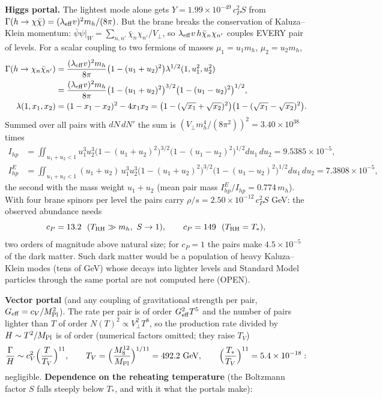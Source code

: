 \documentclass[10pt,a4paper]{article}
\begin{document}
\textbf{Higgs portal.} The lightest mode alone gets $Y=1.99\times10^{-49}\,c_P^2S$ from $\Gamma(h\to\chi\bar\chi)=(\lambda_{\rm eff}v)^2m_h/(8\pi)$. But the brane breaks the conservation of Kaluza–Klein momentum: $\bar\psi\psi|_W=\sum_{n,n'}\bar\chi_n\chi_{n'}/V_\perp$, so $\lambda_{\rm eff}v\,h\bar\chi_n\chi_{n'}$ couples EVERY pair of levels. For a scalar coupling to two fermions of masses $\mu_1=u_1m_h$, $\mu_2=u_2m_h$,
\begin{align*}
\Gamma(h\to\chi_n\bar\chi_{n^\prime})&=\frac{(\lambda_{\rm eff}v)^2m_h}{8\pi}\big(1-(u_1+u_2)^2\big)\lambda^{1/2}(1,u_1^2,u_2^2) \\
&=\frac{(\lambda_{\rm eff}v)^2m_h}{8\pi}\big(1-(u_1+u_2)^2\big)^{3/2}\big(1-(u_1-u_2)^2\big)^{1/2}, \\
\lambda(1,x_1,x_2)&=(1-x_1-x_2)^2-4x_1x_2=\big(1-(\sqrt{x_1}+\sqrt{x_2})^2\big)\big(1-(\sqrt{x_1}-\sqrt{x_2})^2\big).
\end{align*}
Summed over all pairs with $dN\,dN'$ the sum is $(V_\perp m_h^4/(8\pi^2))^2=3.40\times10^{38}$ times
\begin{align*}
I_{hp}&=\iint_{u_1+u_2<1}u_1^3u_2^3\big(1-(u_1+u_2)^2\big)^{3/2}\big(1-(u_1-u_2)^2\big)^{1/2}du_1\,du_2=9.5385\times10^{-5}, \\
I_{hp}^E&=\iint_{u_1+u_2<1}(u_1+u_2)\,u_1^3u_2^3\big(1-(u_1+u_2)^2\big)^{3/2}\big(1-(u_1-u_2)^2\big)^{1/2}du_1\,du_2=7.3808\times10^{-5},
\end{align*}
the second with the mass weight $u_1+u_2$ (mean pair mass $I^E_{hp}/I_{hp}=0.774\,m_h$). With four brane spinors per level the pairs carry $\rho/s=2.50\times10^{-12}\,c_P^2S$ GeV: the observed abundance needs
\begin{equation*}
c_P=13.2\ \ (T_{\rm RH}\gg m_h,\ S\to1),\qquad c_P=149\ \ (T_{\rm RH}=T_*),
\end{equation*}
two orders of magnitude above natural size; for $c_P=1$ the pairs make $4.5\times10^{-5}$ of the dark matter. Such dark matter would be a population of heavy Kaluza–Klein modes (tens of GeV) whose decays into lighter levels and Standard Model particles through the same portal are not computed here (OPEN).

\textbf{Vector portal} (and any coupling of gravitational strength per pair, $G_{\rm eff}=c_V/M_{\rm Pl}^2$). The rate per pair is of order $G_{\rm eff}^2T^5$ and the number of pairs lighter than $T$ of order $N(T)^2\propto V_\perp^2T^8$, so the production rate divided by $H\sim T^2/M_{\rm Pl}$ is of order (numerical factors omitted; they raise $T_V$)
\begin{equation*}
\frac{\Gamma}{H}\sim c_V^2\Big(\frac{T}{T_V}\Big)^{11},\qquad T_V=\Big(\frac{M_8^{12}}{M_{\rm Pl}}\Big)^{1/11}=492.2\ \text{GeV},\qquad \Big(\frac{T_*}{T_V}\Big)^{11}=5.4\times10^{-18}:
\end{equation*}
negligible. \textbf{Dependence on the reheating temperature} (the Boltzmann factor $S$ falls steeply below $T_*$, and with it what the portals make):
\end{document}
